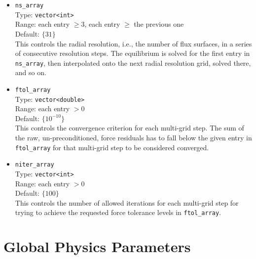 \begin{itemize}

 \item \texttt{ns\_array} \\
       Type: \texttt{vector<int>} \\
       Range: each entry $\ge 3$, each entry $\geq$ the previous one \\
       Default: $\{ 31 \}$ \\
       This controls the radial resolution, i.e., the number of flux surfaces,
       in a series of consecutive resolution steps.
       The equilibrium is solved for the first entry in \texttt{ns\_array},
       then interpolated onto the next radial resolution grid, solved there, and so on.

 \item \texttt{ftol\_array} \\
       Type: \texttt{vector<double>} \\
       Range: each entry $> 0$ \\
       Default: $\{ 10^{-10} \}$ \\
       This controls the convergence criterion for each multi-grid step.
       The sum of the raw, un-preconditioned, force residuals has to fall below
       the given entry in \texttt{ftol\_array} for that multi-grid step to be considered converged.

 \item \texttt{niter\_array} \\
       Type: \texttt{vector<int>} \\
       Range: each entry $> 0$ \\
       Default: $\{ 100 \}$ \\
       This controls the number of allowed iterations for each multi-grid step
       for trying to achieve the requested force tolerance levels in \texttt{ftol\_array}.

\end{itemize}

\section{Global Physics Parameters}

